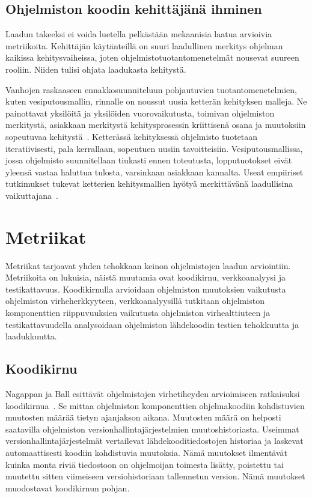 \documentclass[finnish]{../tktltiki2}
\theoremstyle{definition}
\theoremstyle{remark}
\begin{document}
\subsection{Ohjelmiston koodin kehittäjänä ihminen}

Laadun takeeksi ei voida luetella pelkästään mekaanisia laatua arvioivia metriikoita. Kehittäjän käytänteillä on suuri 
laadullinen merkitys ohjelman kaikissa kehitysvaiheissa, joten ohjelmistotuotantomenetelmät nousevat suureen rooliin. 
Niiden tulisi ohjata laadukasta kehitystä.

    Vanhojen raskaaseen ennakkosuunniteluun pohjautuvien tuotantomenetelmien, kuten vesiputousmallin, rinnalle on 
noussut uusia ketterän kehityksen malleja. Ne painottavat yksilöitä ja yksilöiden vuorovaikutusta, toimivan ohjelmiston 
merkitystä, asiakkaan merkitystä kehitysprosessin kriittisenä osana ja muutoksiin sopeutuvaa kehitystä~\cite{BBB01}. 
Ketterässä kehityksessä ohjelmisto tuotetaan iteratiivisesti, pala kerrallaan, sopeutuen uusiin tavoitteisiin. 
Vesiputousmallissa, jossa ohjelmisto suunnitellaan tiukasti ennen toteutusta, lopputuotokset eivät yleensä vastaa 
haluttua tulosta, varsinkaan asiakkaan kannalta. Useat empiiriset tutkimukset tukevat ketterien kehitysmallien hyötyä 
merkittävänä laadullisina vaikuttajana~\cite{SS10}.

\section{Metriikat}

Metriikat tarjoavat yhden tehokkaan keinon ohjelmistojen laadun arviointiin. Metriikoita on lukuisia, näistä muutamia 
ovat koodikirnu, verkkoanalyysi ja testikattavuus. Koodikirnulla arvioidaan ohjelmiston muutoksien vaikutusta 
ohjelmiston virheherkkyyteen, verkkoanalyysillä tutkitaan ohjelmiston komponenttien riippuvuuksien vaikutusta 
ohjelmiston virhealttiuteen ja testikattavuudella analysoidaan ohjelmiston lähdekoodin testien tehokkuutta ja 
laadukkuutta.

\subsection{Koodikirnu}

Nagappan ja Ball esittävät ohjelmistojen virhetiheyden arvioimiseen ratkaisuksi koodikirnua~\cite{NB05}. Se mittaa 
ohjelmiston komponenttien ohjelmakoodiin kohdistuvien muutosten määrää tietyn ajanjakson aikana. Muutosten määrä on 
helposti saatavilla ohjelmiston versionhallintajärjestelmien muutoshistoriasta. Useimmat versionhallintajärjestelmät 
vertailevat lähdekooditiedos\-tojen historiaa ja laskevat automaattisesti koodiin kohdistuvia muutoksia. Nämä muutokset 
ilmentävät kuinka monta riviä tiedostoon on ohjelmoijan toimesta lisätty, poistettu tai muutettu sitten viimeiseen 
versiohistoriaan tallennetun version. Nämä muutokset muodostavat koodikirnun pohjan.
\end{document}
